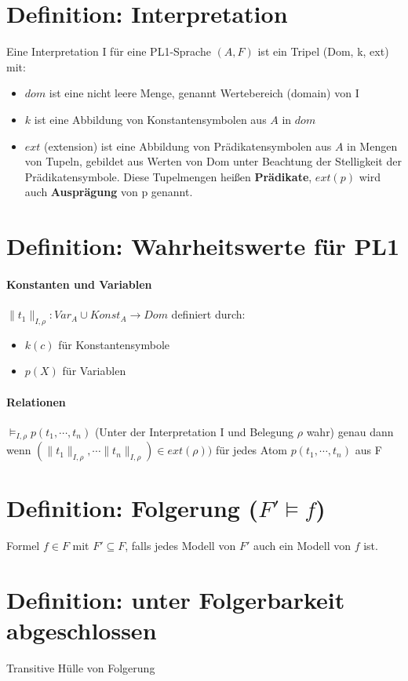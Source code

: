 \documentclass[12pt, a4paper]{article}
\begin{document}
\section*{Definition: Interpretation}
Eine Interpretation I für eine PL1-Sprache $(A,F)$ ist ein Tripel (Dom, k, ext) mit:
\begin{itemize}
\item $dom$ ist eine nicht leere Menge, genannt Wertebereich (domain) von I
\item $k$ ist eine Abbildung von Konstantensymbolen aus $A$ in $dom$
\item $ext$ (extension) ist eine Abbildung von Prädikatensymbolen aus $A$ in Mengen von Tupeln, gebildet aus Werten von Dom unter Beachtung der Stelligkeit der Prädikatensymbole. Diese Tupelmengen heißen \textbf{Prädikate}, $ext(p)$ wird auch \textbf{Ausprägung} von p genannt.
\end{itemize}

\section*{Definition: Wahrheitswerte für PL1}
\paragraph{Konstanten und Variablen}
$\parallel t_1 \parallel_{I, \rho}: Var_A \cup Konst_A \rightarrow Dom$ definiert durch: 
\begin{itemize}
\item $k(c)$ für Konstantensymbole
\item $p(X)$ für Variablen
\end{itemize}

\paragraph{Relationen}
$\models_{I,\rho} p(t_1, \cdots, t_n)$ (Unter der Interpretation I und Belegung $\rho$ wahr) genau dann wenn $(\parallel t_1 \parallel_{I, \rho}, \cdots \parallel t_n \parallel_{I, \rho}) \in ext(\rho))$ für jedes Atom $p(t_1, \cdots, t_n)$ aus F

\section*{Definition: Folgerung ($F' \models f$)}
Formel $f \in F$ mit $F' \subseteq F$, falls jedes Modell von $F'$ auch ein Modell von $f$ ist.

\section*{Definition: unter Folgerbarkeit abgeschlossen}
Transitive Hülle von Folgerung
\end{document}
